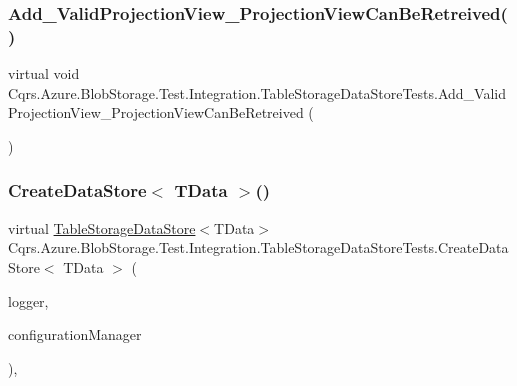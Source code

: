 \subsubsection{\texorpdfstring{Add\+\_\+\+Valid\+Projection\+View\+\_\+\+Projection\+View\+Can\+Be\+Retreived()}{Add\_ValidProjectionView\_ProjectionViewCanBeRetreived()}}
{\footnotesize\ttfamily virtual void Cqrs.\+Azure.\+Blob\+Storage.\+Test.\+Integration.\+Table\+Storage\+Data\+Store\+Tests.\+Add\+\_\+\+Valid\+Projection\+View\+\_\+\+Projection\+View\+Can\+Be\+Retreived (\begin{DoxyParamCaption}{ }\end{DoxyParamCaption})\hspace{0.3cm}{\ttfamily [virtual]}}

\mbox{\label{classCqrs_1_1Azure_1_1BlobStorage_1_1Test_1_1Integration_1_1TableStorageDataStoreTests_a76d6ef854f24e39f80de66e86cfa967c_a76d6ef854f24e39f80de66e86cfa967c}} 
\subsubsection{\texorpdfstring{Create\+Data\+Store$<$ T\+Data $>$()}{CreateDataStore< TData >()}}
{\footnotesize\ttfamily virtual \hyperlink{classCqrs_1_1Azure_1_1BlobStorage_1_1DataStores_1_1TableStorageDataStore}{Table\+Storage\+Data\+Store}$<$T\+Data$>$ Cqrs.\+Azure.\+Blob\+Storage.\+Test.\+Integration.\+Table\+Storage\+Data\+Store\+Tests.\+Create\+Data\+Store$<$ T\+Data $>$ (\begin{DoxyParamCaption}\item[{I\+Logger}]{logger,  }\item[{\hyperlink{interfaceCqrs_1_1Configuration_1_1IConfigurationManager}{I\+Configuration\+Manager}}]{configuration\+Manager }\end{DoxyParamCaption})\hspace{0.3cm}{\ttfamily [protected]}, {\ttfamily [virtual]}}



